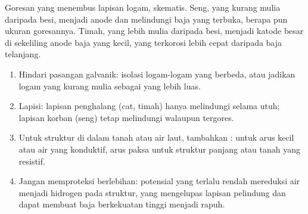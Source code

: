 \begin{omfigure}

{\small Goresan yang menembus lapisan logam, skematis. Seng, yang kurang
mulia daripada besi, menjadi anode dan melindungi baja yang terbuka, berapa
pun ukuran goresannya. Timah, yang lebih mulia daripada besi, menjadi
katode besar di sekeliling anode baja yang kecil, yang terkorosi lebih
cepat daripada baja telanjang.}
\end{omfigure}

\begin{method}\label{met:b2:corrosion:choose-protection}
\begin{enumerate}
  \item Hindari pasangan galvanik: isolasi logam-logam yang berbeda, atau
        jadikan logam yang kurang mulia sebagai yang lebih luas.
  \item Lapisi: lapisan penghalang (cat, timah) hanya melindungi selama
        utuh; lapisan korban (seng) tetap melindungi walaupun tergores.
  \item Untuk struktur di dalam tanah atau air laut, tambahkan :  untuk arus kecil atau air yang konduktif, arus
        paksa untuk struktur panjang atau tanah yang resistif.
  \item Jangan memproteksi berlebihan: potensial yang terlalu rendah
        mereduksi air menjadi hidrogen pada struktur, yang mengelupas
        lapisan pelindung dan dapat membuat baja berkekuatan tinggi
        menjadi rapuh.
\end{enumerate}
\end{method}

